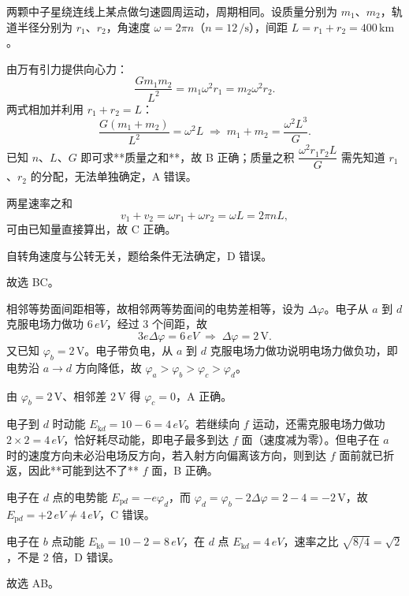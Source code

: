 \begin{answer}
两颗中子星绕连线上某点做匀速圆周运动，周期相同。设质量分别为 $m_{1}$、$m_{2}$，轨道半径分别为 $r_{1}$、$r_{2}$，角速度 $\omega=2\pi n$（$n=12\,\si{\per\second}$），间距 $L=r_{1}+r_{2}=400\,\si{\kilo\metre}$。

由万有引力提供向心力：
\[
  \frac{Gm_{1}m_{2}}{L^{2}}=m_{1}\omega^{2}r_{1}=m_{2}\omega^{2}r_{2}.
\]
两式相加并利用 $r_{1}+r_{2}=L$：
\[
  \frac{G(m_{1}+m_{2})}{L^{2}}=\omega^{2}L
  \;\Longrightarrow\;
  m_{1}+m_{2}=\frac{\omega^{2}L^{3}}{G}.
\]
已知 $n$、$L$、$G$ 即可求**质量之和**，故 B 正确；质量之积 $\dfrac{\omega^{2}r_{1}r_{2}L}{G}$ 需先知道 $r_{1}$、$r_{2}$ 的分配，无法单独确定，A 错误。

两星速率之和
\[
  v_{1}+v_{2}=\omega r_{1}+\omega r_{2}=\omega L=2\pi nL,
\]
可由已知量直接算出，故 C 正确。

自转角速度与公转无关，题给条件无法确定，D 错误。

故选 BC。
\end{answer}

\begin{answer}
相邻等势面间距相等，故相邻两等势面间的电势差相等，设为 $\Delta\varphi$。电子从 $a$ 到 $d$ 克服电场力做功 $6\,\si{eV}$，经过 3 个间距，故
\[
  3e\Delta\varphi=6\,\si{eV}\;\Longrightarrow\;\Delta\varphi=2\,\si{\volt}.
\]
又已知 $\varphi_{b}=2\,\si{\volt}$。电子带负电，从 $a$ 到 $d$ 克服电场力做功说明电场力做负功，即电势沿 $a\to d$ 方向降低，故 $\varphi_{a}>\varphi_{b}>\varphi_{c}>\varphi_{d}$。

由 $\varphi_{b}=2\,\si{\volt}$、相邻差 $2\,\si{\volt}$ 得 $\varphi_{c}=0$，A 正确。

电子到 $d$ 时动能 $E_{\mathrm{k}d}=10-6=4\,\si{eV}$。若继续向 $f$ 运动，还需克服电场力做功 $2\times2=4\,\si{eV}$，恰好耗尽动能，即电子最多到达 $f$ 面（速度减为零）。但电子在 $a$ 时的速度方向未必沿电场反方向，若入射方向偏离该方向，则到达 $f$ 面前就已折返，因此**可能到达不了** $f$ 面，B 正确。

电子在 $d$ 点的电势能 $E_{\mathrm{p}d}=-e\varphi_{d}$，而 $\varphi_{d}=\varphi_{b}-2\Delta\varphi=2-4=-2\,\si{\volt}$，故 $E_{\mathrm{p}d}=+2\,\si{eV}\neq 4\,\si{eV}$，C 错误。

电子在 $b$ 点动能 $E_{\mathrm{k}b}=10-2=8\,\si{eV}$，在 $d$ 点 $E_{\mathrm{k}d}=4\,\si{eV}$，速率之比 $\sqrt{8/4}=\sqrt{2}$，不是 2 倍，D 错误。

故选 AB。
\end{answer}

